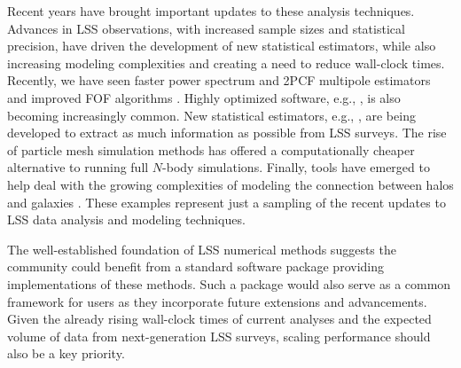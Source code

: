 Recent years have brought important updates to these analysis techniques.
Advances in LSS observations, with increased sample sizes and statistical
precision, have driven the development of new statistical estimators,
while also increasing modeling complexities and creating a need to reduce
wall-clock times. Recently, we have seen faster power spectrum and
2PCF multipole estimators
\citep{Yamamoto:2006,Scoccimarro:2015,Bianchi:2015,Slepian:2015b,Slepian:2016,Hand:2017}
and improved FOF algorithms \citep{Springel:2005, Behroozi:2013,Feng:2017}.
Highly optimized software, e.g., \Corrfunc{} \citep{Sinha:2017},
is also becoming increasingly common.
New statistical estimators, e.g., \citet{Slepian:2015,Slepian:2017b,Castorina:2017},
are being developed to extract as much information as possible
from LSS surveys. The rise of particle mesh simulation methods
\citep{Merz:2005,Tassev:2013,White:2014,Feng:2016b} has offered a
computationally cheaper alternative to running full $N$-body simulations.
Finally, tools have emerged to help deal with the growing
complexities of modeling the connection between halos and galaxies
\citep{Hearin:2017}. These examples represent just a sampling of the
recent updates to LSS data analysis and modeling techniques.

The well-established foundation of LSS numerical methods suggests the
community could benefit from a standard software package providing
implementations of these methods. Such a package would also serve as a
common framework for users as they incorporate future extensions and
advancements. Given the already rising wall-clock times of current analyses
and the expected volume of data from next-generation LSS surveys,
scaling performance should also be a key priority.

